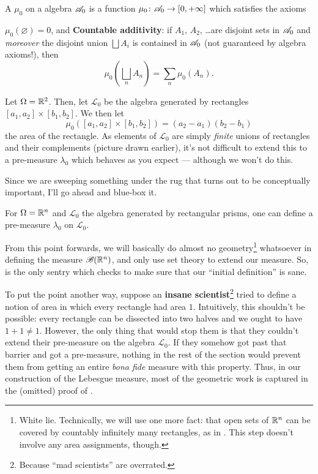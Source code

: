 \begin{definition}
	A  $\mu_0$ on a algebra $\mathscr A_0$
	is a function $\mu_0 \colon \mathscr A_0 \to [0, +\infty]$
	which satisfies the axioms
	\begin{itemize}
		\ii $\mu_0(\varnothing) = 0$, and
		\ii \textbf{Countable additivity}:
		if $A_1$, $A_2$, \dots are disjoint sets in $\mathscr A_0$
		and \emph{moreover} the disjoint union $\bigsqcup A_i$
		is contained in $\mathscr A_0$ (not guaranteed by algebra axioms!),
		then
		\[ \mu_0\left( \bigsqcup_n A_n \right) = \sum_n \mu_0(A_n). \]
	\end{itemize}
\end{definition}

\begin{example}
	Let $\Omega = \mathbb R^2$.
	Then, let $\mathcal{L}_0$ be the algebra generated by rectangles
	$[a_1, a_2] \times [b_1, b_2]$.
	We then let
	\[ \mu_0\left( [a_1, a_2] \times [b_1, b_2] \right)
	= (a_2-a_1)(b_2-b_1) \]
	the area of the rectangle.
	As elements of $\mathcal{L}_0$ are simply \emph{finite} unions
	of rectangles and their complements (picture drawn earlier),
	it's not difficult to extend this to a pre-measure $\lambda_0$
	which behaves as you expect --- although we won't do this.
\end{example}

Since we are sweeping something under the rug that
turns out to be conceptually important,
I'll go ahead and blue-box it.
\begin{proposition}
	\label{prop:lebesgue_rectangle}
	For $\Omega = \mathbb R^n$ and $\mathcal{L}_0$
	the algebra generated by rectangular prisms,
	one can define a pre-measure $\lambda_0$ on $\mathcal{L}_0$.
\end{proposition}
From this point forwards, we will basically do
almost no geometry\footnote{White lie.
	Technically, we will use one more fact:
	that open sets of $\mathbb R^n$ can be covered by countably
	infinitely many rectangles,
	as in .
	This step doesn't involve any area assignments, though.}
whatsoever in defining the measure $\mathscr B(\mathbb R^n)$,
and only use set theory to extend our measure.
So,  is the only sentry
which checks to make sure that our ``initial definition'' is sane.

To put the point another way,
suppose an \textbf{insane scientist}\footnote{Because
	``mad scientists'' are overrated.}
tried to define a notion
of area in which every rectangle had area $1$.
Intuitively, this shouldn't be possible:
every rectangle can be dissected into two halves
and we ought to have $1+1 \neq 1$.
However, the only thing that would stop them is that they couldn't
extend their pre-measure on the algebra $\mathcal{L}_0$.
If they somehow got past that barrier and got a pre-measure,
nothing in the rest of the section would prevent them
from getting an entire \emph{bona fide} measure with this property.
Thus, in our construction of the Lebesgue measure,
most of the geometric work is captured in the (omitted) proof
of .

